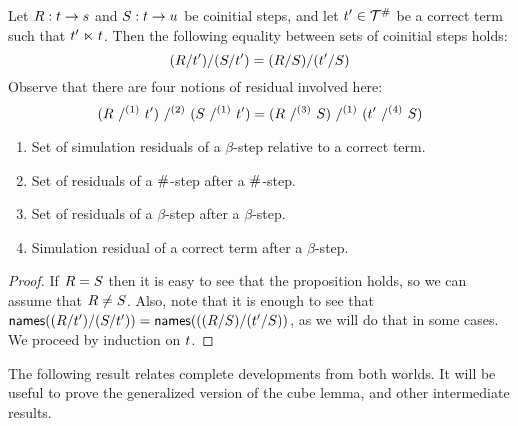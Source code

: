 \begin{lemma}
Let $R : t \to s$ and $S : t \to u$ be coinitial steps,
and let $t' \in \mathcal{T}^{\mathtt{\#}}$ be a correct term such that $t' \mathrel{\ltimes} t$.
Then the following equality between sets of coinitial steps holds:
\[
  (R/t')/(S/t') = (R/S)/(t'/S)
\]
Observe that there are four notions of residual involved here:
\[
  (\redex\ /^{(1)}\ \tm')\ /^{(2)}\ (\redextwo\ /^{(1)}\ \tm') = (\redex\ /^{(3)}\ \redextwo)\ /^{(1)}\ (\tm'\ /^{(4)}\ \redextwo)
\]
\begin{enumerate}
\item Set of simulation residuals of a $\beta$-step relative to a correct term.
\item Set of residuals of a $\mathtt{\#}$-step after a $\mathtt{\#}$-step.
\item Set of residuals of a $\beta$-step after a $\beta$-step.
\item Simulation residual of a correct term after a $\beta$-step.
\end{enumerate}
\end{lemma}
\begin{proof}
If $R = S$ then it is easy to see that the proposition holds, so we can assume that $R \neq S$.
  Also, note that it is enough to see that $\mathsf{names}((R/t')/(S/t')) = \mathsf{names}(((R/S)/(t'/S))$, as we will do that in some cases.
We proceed by induction on $t$.
\end{proof}

The following result relates complete developments from both worlds. It will be
useful to prove the generalized version of the cube lemma, and other intermediate results.

